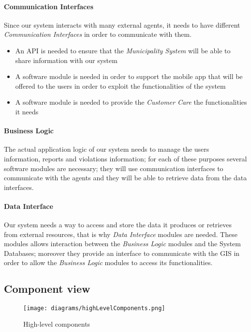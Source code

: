 		\paragraph{Communication Interfaces}
			Since our system interacts with many external agents, it needs to have different \emph{Communication Interfaces} in order to communicate with them. 
		\begin{itemize}
			\item An API is needed to ensure that the \emph{Municipality System} will be able to share information with our system
			\item A software module is needed in order to support the mobile app that will be offered to the users in order to exploit the functionalities of the system 
			\item A software module is needed to provide the \emph{Customer Care} the functionalities it needs
		\end{itemize}

		\paragraph{Business Logic}
			The actual application logic of our system needs to manage the users information, reports and violations information; for each of these purposes several software modules are necessary; they will use communication interfaces to communicate with the agents and they will be able to retrieve data from the data interfaces.
		\paragraph{Data Interface}
			Our system needs a way to access and store the data it produces or retrieves from external resources, that is why \emph{Data Interface} modules are needed. These modules allows interaction between the \emph{Business Logic} modules and the System Databases; moreover they provide an interface to communicate with the GIS in order to allow the \emph{Business Logic} modules to access its functionalities.

\clearpage

\subsection{Component view}
\begin{figure}[h]
	\centering
	\texttt{[image: diagrams/highLevelComponents.png]}
	\caption{
		\label{fig:highLevelComponents} 
		High-level components
	}
\end{figure}

